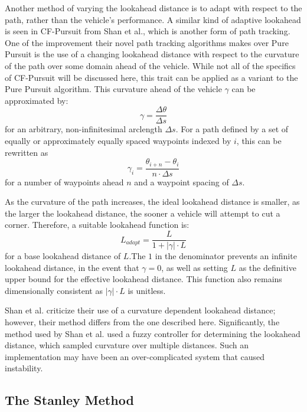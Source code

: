 \documentclass[mla7]{mla}
\begin{document}
\begin{paper}
Another method of varying the lookahead distance is to adapt with respect to the path, rather than the vehicle's performance. A similar kind of adaptive lookahead is seen in CF-Pursuit from Shan et al., which is another form of path tracking. One of the improvement their novel path tracking algorithms makes over Pure Pursuit is the use of a changing lookahead distance with respect to the curvature of the path over some domain ahead of the vehicle. While not all of the specifics of CF-Pursuit will be discussed here, this trait can be applied as a variant to the Pure Pursuit algorithm. This curvature ahead of the vehicle $\gamma$ can be approximated by: 
\begin{equation*}
\gamma = \frac{\Delta\theta}{\Delta s}
\end{equation*}
for an arbitrary, non-infinitesimal arclength $\Delta s$. For a path defined by a set of equally or approximately equally spaced waypoints indexed by $i$, this can be rewritten as
\begin{equation}
\gamma_i = \frac{\theta_{i+n}-\theta_i}{n \cdot \Delta s}
\end{equation}
for a number of waypoints ahead $n$ and a waypoint spacing of $\Delta s$.

As the curvature of the path increases, the ideal lookahead distance is smaller, as the larger the lookahead distance, the sooner a vehicle will attempt to cut a corner. Therefore, a suitable lookahead function is:
\begin{equation}
L_{adapt} = \frac{L}{1+|\gamma| \cdot L}
\end{equation}
for a base lookahead distance of $L$.The $1$ in the denominator prevents an infinite lookahead distance, in the event that $\gamma=0$, as well as setting $L$ as the definitive upper bound for the effective lookahead distance. This function also remains dimensionally consistent as $|\gamma| \cdot L$ is unitless.

Shan et al. criticize their use of a curvature dependent lookahead distance; however, their method differs from the one described here. Significantly, the method used by Shan et al. used a fuzzy controller for determining the lookahead distance, which sampled curvature over multiple distances. Such an implementation may have been an over-complicated system that caused instability.


\subsection{The Stanley Method}


\end{paper}
\end{document}
